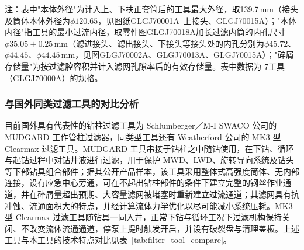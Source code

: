注：表中"本体外径"为计入上、下扶正套筒后的工具最大外径，取139.7\,mm（接头及筒体本体外径为$\phi 120.65$，见图纸GLGJ70001A--上接头、GLGJ70015A）；"本体内径"指工具的最小过流内径，取零件图GLGJ70018A加长过滤内筒的内孔尺寸$\phi 35.05\pm 0.25\,\text{mm}$（滤进接头、滤出接头、下接头等接头处的内孔分别为$\phi 45.72$、$\phi 44.45$、$\phi 44.45\,\text{mm}$，见图GLGJ70002A、GLGJ70013A、GLGJ70015A）；"碎屑存储量"为按过滤腔容积并计入滤网孔隙率后的有效存储量。表中数据为 7\inch 工具（GLGJ70000A）的规格。



\subsubsection{与国外同类过滤工具的对比分析}
\label{sec:filter_tool_compare}

目前国外具有代表性的钻柱过滤工具为 Schlumberger／M-I SWACO 公司的 MUDGARD 工作管柱过滤器，同类型工具还有 Weatherford 公司的 MK3 型 Clearmax 过滤工具。MUDGARD 工具串接于钻柱之中随钻使用，在下钻、循环与起钻过程中对钻井液进行过滤，用于保护 MWD、LWD、旋转导向系统及钻头等下部钻具组合部件；据其公开产品样本，该工具采用整体式高强度筒体、无内部连接，设有应急中心旁通，可在不起出钻柱部件的条件下建立完整的钢丝作业通道，并在碎屑量超出预期、大容量滤网被堵塞时重新建立过流通道；其滤网具有抗冲蚀、流通面积大的特点，并经计算流体力学优化以尽可能减小系统压耗。MK3 型 Clearmax 过滤工具随钻具一同入井，正常下钻与循环工况下过滤机构保持关闭、不改变流体流通通道，停泵上提时触发开启，并设有破裂盘与清理盖板。上述工具与本工具的技术特点对比见表~\ref{tab:filter_tool_compare}。

